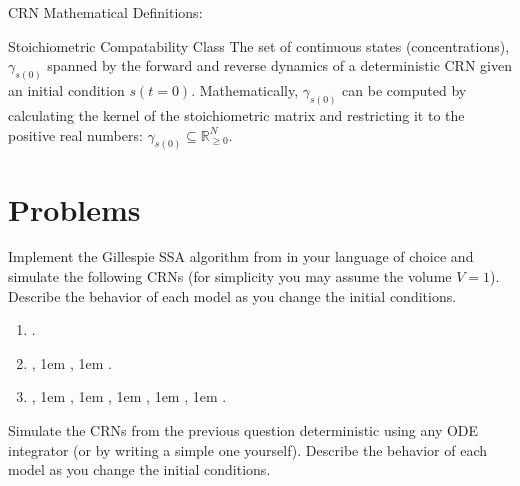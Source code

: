\begin{breakout}[label=box:crn:definitions]{CRN Mathematical Definitions:}
  \begin{definition}{Stoichiometric Compatability Class}
    The set of continuous states (concentrations), $\gamma_{s(0)}$ spanned by the forward and reverse dynamics of a deterministic CRN given an initial condition $s(t=0)$.
    Mathematically, $\gamma_{s(0)}$ can be computed by calculating the kernel of the stoichiometric matrix and restricting it to the positive real numbers: $\gamma_{s(0)} \subseteq \mathbb{R}_{\geq 0}^N$.
  \end{definition}
\end{breakout}

\section{Problems}

\begin{problem}[quantitative]
  Implement the Gillespie SSA algorithm from  in your language of choice and simulate the following CRNs (for simplicity you may assume the volume $V = 1$).
  Describe the behavior of each model as you change the initial conditions.
  \begin{enumerate}[label=\alph*)]
    \item {}.
    \item {}, \kern1em
          , \kern1em
          .
    \item {}, \kern1em
          , \kern1em
          , \kern1em
          , \kern1em
          , \kern1em
          .
  \end{enumerate}
\end{problem}

\begin{problem}[quantitative]
  Simulate the CRNs from the previous question deterministic using any ODE integrator (or by writing a simple one yourself).
  Describe the behavior of each model as you change the initial conditions.
\end{problem}

